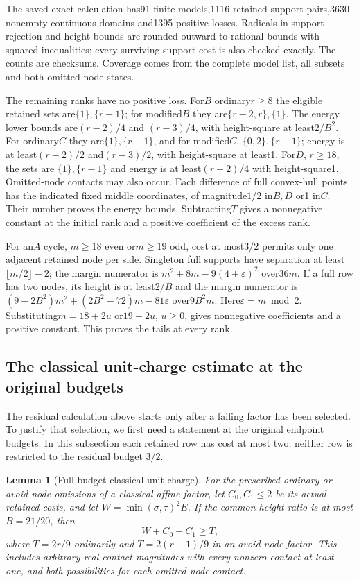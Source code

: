 \documentclass[11pt]{article}
\newtheorem{lemma}[theorem]{Lemma}
\theoremstyle{remark}\newtheorem{remark}[theorem]{Remark}
\begin{document}
The saved exact calculation has91 finite models,1116 retained
support pairs,3630 nonempty continuous domains and1395 positive
losses. Radicals in support rejection and height bounds are rounded
outward to rational bounds with squared inequalities; every surviving
support cost is also checked exactly. The counts are checksums.
Coverage comes from the complete model list, all subsets and both
omitted-node states.

The remaining ranks have no positive loss. For$B$ ordinary$r\ge8$
the eligible retained sets are$\{1\},\{r-1\}$; for modified$B$ they
are$\{r-2,r\},\{1\}$. The energy lower bounds are$(r-2)/4$ and
$(r-3)/4$, with height-square at least$2/B^2$.
For ordinary$C$ they are$\{1\},\{r-1\}$, and for modified$C$,
$\{0,2\},\{r-1\}$; energy is at least$(r-2)/2$ and$(r-3)/2$,
with height-square at least1. For$D$, $r\ge18$, the sets are
$\{1\},\{r-1\}$ and energy is at least$(r-2)/4$ with height-square1.
Omitted-node contacts may also occur. Each difference of full
convex-hull points has the indicated fixed middle coordinates,
of magnitude$1/2$ in$B,D$ or1 in$C$. Their number proves the
energy bounds. Subtracting$T$ gives a nonnegative constant at the
initial rank and a positive coefficient of the excess rank.

For an$A$ cycle, $m\ge18$ even or$m\ge19$ odd, cost at most$3/2$
permits only one adjacent retained node per side. Singleton full
supports have separation at least$\lfloor m/2\rfloor-2$;
the margin numerator is
$m^2+8m-9(4+\varepsilon)^2$ over$36m$.
If a full row has two nodes, its height is at least$2/B$ and the
margin numerator is
$(9-2B^2)m^2+(2B^2-72)m-81\varepsilon$ over$9B^2m$.
Here$\varepsilon=m\bmod2$. Substituting$m=18+2u$ or$19+2u$,
$u\ge0$, gives nonnegative coefficients and a positive constant.
This proves the tails at every rank.

\subsection{The classical unit-charge estimate at the original budgets}
\label{app:full-budget-classical}

The residual calculation above starts only after a failing factor has
been selected. To justify that selection, we first need a statement at
the original endpoint budgets. In this subsection each retained row has
cost at most two; neither row is restricted to the residual budget
$3/2$.

\begin{lemma}[Full-budget classical unit charge]
\label{lem:full-budget-classical-unit}
For the prescribed ordinary or avoid-node omissions of a classical
affine factor, let $C_0,C_1\le2$ be its actual retained costs, and let
$W=\min(\sigma,\tau)^2E$. If the common height ratio is at most
$B=21/20$, then
\[
 W+C_0+C_1\ge T,
\]
where $T=2r/9$ ordinarily and $T=2(r-1)/9$ in an avoid-node factor.
This includes arbitrary real contact magnitudes with every nonzero
contact at least one, and both possibilities for each omitted-node
contact.
\end{lemma}
\end{document}
